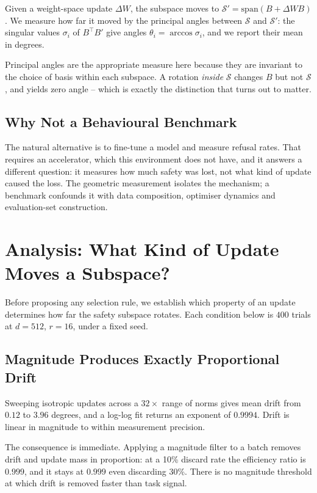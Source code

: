 \documentclass{article}
\begin{document}
Given a weight-space update $\Delta W$, the subspace moves to $\mathcal{S}' = \mathrm{span}(B + \Delta W B)$. We measure how far it moved by the principal angles between $\mathcal{S}$ and $\mathcal{S}'$: the singular values $\sigma_i$ of $B^{\top} B'$ give angles $\theta_i = \arccos \sigma_i$, and we report their mean in degrees.

Principal angles are the appropriate measure here because they are invariant to the choice of basis within each subspace. A rotation \textit{inside} $\mathcal{S}$ changes $B$ but not $\mathcal{S}$, and yields zero angle -- which is exactly the distinction that turns out to matter.


\subsection{Why Not a Behavioural Benchmark}


The natural alternative is to fine-tune a model and measure refusal rates. That requires an accelerator, which this environment does not have, and it answers a different question: it measures how much safety was lost, not what kind of update caused the loss. The geometric measurement isolates the mechanism; a benchmark confounds it with data composition, optimiser dynamics and evaluation-set construction.




\section{Analysis: What Kind of Update Moves a Subspace?}


Before proposing any selection rule, we establish which property of an update determines how far the safety subspace rotates. Each condition below is $400$ trials at $d = 512$, $r = 16$, under a fixed seed.


\subsection{Magnitude Produces Exactly Proportional Drift}


Sweeping isotropic updates across a $32\times$ range of norms gives mean drift from $0.12$ to $3.96$ degrees, and a log-log fit returns an exponent of $0.9994$. Drift is linear in magnitude to within measurement precision.

The consequence is immediate. Applying a magnitude filter to a batch removes drift and update mass in proportion: at a 10\% discard rate the efficiency ratio is $0.999$, and it stays at $0.999$ even discarding 30\%. There is no magnitude threshold at which drift is removed faster than task signal.
\end{document}
